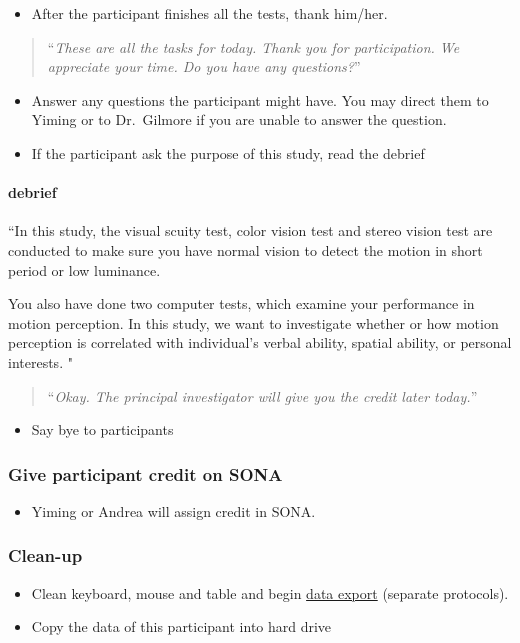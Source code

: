 \documentclass[]{article}
\providecommand{\tightlist}{%
  \setlength{\itemsep}{0pt}\setlength{\parskip}{0pt}}
\let\oldparagraph\paragraph
\renewcommand{\paragraph}[1]{\oldparagraph{#1}\mbox{}}
\begin{document}
\begin{itemize}
\tightlist
\item
  After the participant finishes all the tests, thank him/her.
\end{itemize}

\begin{quote}
``\emph{These are all the tasks for today. Thank you for participation.
We appreciate your time. Do you have any questions?}''
\end{quote}

\begin{itemize}
\tightlist
\item
  Answer any questions the participant might have. You may direct them
  to Yiming or to Dr.~Gilmore if you are unable to answer the question.
\item
  If the participant ask the purpose of this study, read the debrief
\end{itemize}

\paragraph{debrief}\label{debrief}

``In this study, the visual scuity test, color vision test and stereo
vision test are conducted to make sure you have normal vision to detect
the motion in short period or low luminance.

You also have done two computer tests, which examine your performance in
motion perception. In this study, we want to investigate whether or how
motion perception is correlated with individual's verbal ability,
spatial ability, or personal interests. "

\begin{quote}
``\emph{Okay. The principal investigator will give you the credit later
today.}''
\end{quote}

\begin{itemize}
\tightlist
\item
  Say bye to participants
\end{itemize}

\subsubsection{Give participant credit on
SONA}\label{give-participant-credit-on-sona}

\begin{itemize}
\tightlist
\item
  Yiming or Andrea will assign credit in SONA.
\end{itemize}

\subsubsection{Clean-up}\label{clean-up}

\begin{itemize}
\tightlist
\item
  Clean keyboard, mouse and table and begin
  \href{sex-differences-data-export.md}{data export} (separate
  protocols).
\item
  Copy the data of this participant into hard drive
\end{itemize}
\end{document}
